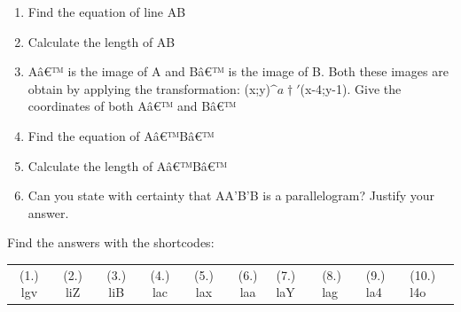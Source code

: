 \begin{enumerate}[noitemsep, label=\textbf{\arabic*}. ]
\begin{figure}[H]
 \end{figure}   

    \addtocounter{footnote}{-0}
    \label{m39167*id982373}\begin{enumerate}[noitemsep, label=\textbf{\alph*}. ] 
            \item Find the equation of line AB \item Calculate the length of AB\item  A\^{a}€™ is the image of A and B\^{a}€™ is the image of B. Both these images are obtain by applying the transformation: (x;y)\begin{math}\^{a}†'\end{math}(x-4;y-1). Give the coordinates of both A\^{a}€™ and B\^{a}€™\item Find the equation of A\^{a}€™B\^{a}€™\item Calculate the length of A\^{a}€™B\^{a}€™\item Can you state with certainty that AA'B'B is a parallelogram? Justify your answer.\end{enumerate}
                 \end{enumerate}
        
        

      
\label{m39167**end}
          
       
    
  \label{71522cd1c95e0cbedb9f300409036b1b**end}
    
\par {} Find the answers with the shortcodes:
 \par \begin{tabular}[h]{cccccc}
 (1.) lgv  &  (2.) liZ  &  (3.) liB  &  (4.) lac  &  (5.) lax  &  (6.) laa  &  (7.) laY  &  (8.) lag  &  (9.) la4  &  (10.) l4o  & \end{tabular}



